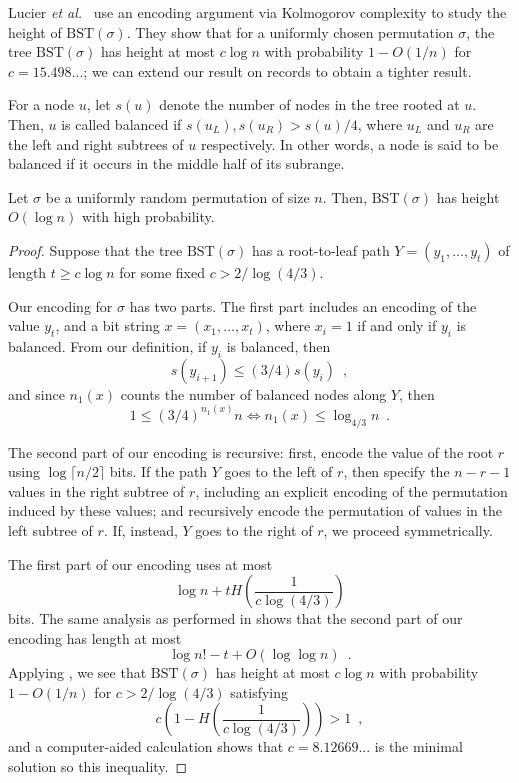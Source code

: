 \documentclass{patmorin}
\begin{document}
Lucier \emph{et al.}~\cite{lucier.jiang.li:quicksort} use an encoding
argument via Kolmogorov complexity to study the height of
$\text{BST}(\sigma)$. They show that for a uniformly chosen
permutation $\sigma$, the tree $\text{BST}(\sigma)$ has height at most
$c \log n$ with probability $1 - O(1/n)$ for $c = 15.498...$; we can
extend our result on records to obtain a tighter result.

For a node $u$, let $s(u)$ denote the number of nodes in the tree
rooted at $u$. Then, $u$ is called balanced if
$s(u_L), s(u_R) > s(u)/4$, where $u_L$ and $u_R$ are the left and
right subtrees of $u$ respectively. In other words, a node is said to
be balanced if it occurs in the middle half of its subrange.

\begin{thm}
  Let $\sigma$ be a uniformly random permutation of size $n$. Then,
  $\text{BST}(\sigma)$ has height $O(\log n)$ with high probability.
\end{thm}
\begin{proof}
  Suppose that the tree $\text{BST}(\sigma)$ has a root-to-leaf path
  $Y = (y_1, \ldots, y_t)$ of length $t \geq c \log n$ for some fixed
  $c > 2/\log (4/3)$.

  Our encoding for $\sigma$ has two parts. The first part includes an
  encoding of the value $y_t$, and a bit string $x = (x_1, \ldots,
  x_t)$, where $x_i = 1$ if and only if $y_i$ is balanced. From our
  definition, if $y_i$ is balanced, then
  \[
  s(y_{i + 1}) \leq (3/4) s(y_i) \enspace ,
  \]
  and since $n_1(x)$ counts the number of balanced nodes along $Y$,
  then
  \[
  1 \leq (3/4)^{n_1(x)} n \iff n_1(x) \leq \log_{4/3} n \enspace .
  \]

  The second part of our encoding is recursive: first, encode the
  value of the root $r$ using $\log \lceil n/2 \rceil$ bits. If the
  path $Y$ goes to the left of $r$, then specify the $n - r - 1$
  values in the right subtree of $r$, including an explicit encoding
  of the permutation induced by these values; and recursively encode
  the permutation of values in the left subtree of $r$. If, instead,
  $Y$ goes to the right of $r$, we proceed symmetrically.
 
  The first part of our encoding uses at most
  \[
  \log n + t H\left(\frac{1}{c \log (4/3)}\right)
  \]
  bits. The same analysis as performed in  shows that
  the second part of our encoding has length at most
  \[
  \log n! - t + O(\log \log n) \enspace .
  \]
  Applying , we see that $\text{BST}(\sigma)$ has height
  at most $c \log n$ with probability $1 - O(1/n)$ for
  $c > 2/\log (4/3)$ satisfying
  \[
  c \left(1 - H\left(\frac{1}{c \log (4/3)}\right)\right) > 1 \enspace ,
  \]
  and a computer-aided calculation shows that $c = 8.12669...$ is the
  minimal solution so this inequality.
\end{proof}
\end{document}
